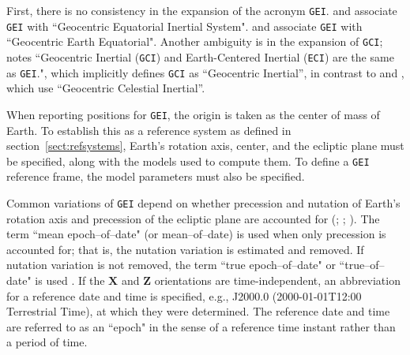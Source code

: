 \documentclass[draft]{agujournal2019}
\begin{document}
First, there is no consistency in the expansion of the acronym \texttt{GEI}.  and  associate \texttt{GEI} with ``Geocentric Equatorial Inertial System".  and  associate \texttt{GEI} with ``Geocentric Earth Equatorial". Another ambiguity is in the expansion of \texttt{GCI};  notes ``Geocentric Inertial (\texttt{GCI}) and Earth-Centered Inertial (\texttt{ECI}) are the same as \texttt{GEI}.", which implicitly defines \texttt{GCI} as ``Geocentric Inertial'', in contrast to  and
, which use ``Geocentric Celestial Inertial''. 


When reporting positions for \texttt{GEI}, the origin is taken as the center of mass of Earth. To establish this as a reference system as defined in section~\ref{sect:refsystems}, Earth's rotation axis, center, and the ecliptic plane must be specified, along with the models used to compute them. To define a \texttt{GEI} reference frame, the model parameters must also be specified.

Common variations of \texttt{GEI} depend on whether precession and nutation of Earth's rotation axis and precession of the ecliptic plane are accounted for (; ; ). The term ``mean epoch--of--date" (or mean--of--date) is used when only precession is accounted for; that is, the nutation variation is estimated and removed. If nutation variation is not removed, the term ``true epoch--of--date" or ``true--of--date" is used \cite{Hapgood1995}. If the $\mathbf{X}$ and $\mathbf{Z}$ orientations are time-independent, an abbreviation for a reference date and time is specified, e.g., J2000.0 (2000-01-01T12:00 Terrestrial Time), at which they were determined. The reference date and time are referred to as an ``epoch" in the sense of a reference time instant rather than a period of time.

\end{document}
